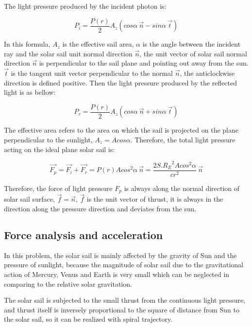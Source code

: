 \documentclass[../Paper.tex]{subfiles}
\begin{document}
The light pressure produced by the incident photon is:

\begin{equation}
P_i=\frac{P(r)}{2}A_z(cos\alpha~\vec{n}-sin\alpha~\vec{t})
\label{eq:1}
\end{equation}

In this formula, $A_z$ is the effective sail area, $\alpha$ is the angle between the incident ray and the solar sail unit normal direction $\vec{n}$, the unit vector of solar sail normal direction $\vec{n}$ is perpendicular to the sail plane and pointing out away from the sun. $\vec{t}$ is the tangent unit vector perpendicular to the normal $\vec{n}$, the anticlockwise direction is defined positive. Then the light pressure produced by the reflected light is as bellow:

\begin{equation}
P_r=\frac{P(r)}{2}A_z(cos\alpha~\vec{n}+sin\alpha~\vec{t})
\label{eq:2}
\end{equation}

The effective area refers to the area on which the sail is projected on the plane perpendicular to the sunlight, $A_z=Acos\alpha$. Therefore, the total light pressure acting on the ideal plane solar sail is:

\begin{equation}	
\vec{F_p}=\vec{F_i}+\vec{F_r}=P(r)Acos^2\alpha~\vec{n}=\dfrac{2S.{R_E}^2Acos^2\alpha}{cr^2}~\vec{n}
\label{eq:3}
\end{equation}

Therefore, the force of light pressure $F_p$ is always along the normal direction of solar sail surface, $\vec{f}=\vec{n}$, $\vec{f}$ is the unit vector of thrust, it is always in the direction along the pressure direction and deviates from the sun.

\subsection{Force analysis and acceleration}

In this problem, the solar sail is mainly affected by the gravity of Sun and the pressure of sunlight, because the magnitude of solar sail due to the gravitational action of Mercury, Venus and Earth is very small which can be neglected in comparing to the relative solar gravitation.

The solar sail is subjected to the small thrust from the continuous light pressure, and thrust itself is inversely proportional to the square of distance from Sun to the solar sail, so it can be realized with spiral trajectory.      
\end{document}

